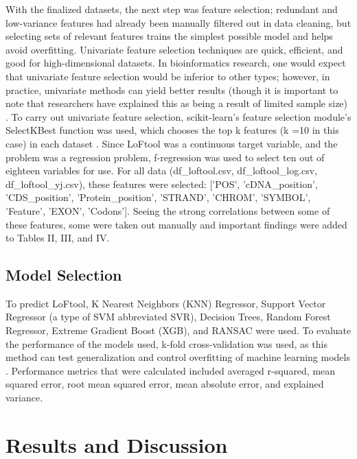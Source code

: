 \documentclass[journal,two side,web]{ieeecolor}
\begin{document}
With the finalized datasets, the next step was feature selection; redundant and low-variance features had already been manually filtered out in data cleaning, but selecting sets of relevant features trains the simplest possible model and helps avoid overfitting. Univariate feature selection techniques are quick, efficient, and good for high-dimensional datasets. In bioinformatics research, one would expect that univariate feature selection would be inferior to other types; however, in practice, univariate methods can yield better results (though it is important to note that researchers have explained this as being a result of limited sample size) \cite{ni2012review}. To carry out univariate feature selection, scikit-learn’s feature selection module’s SelectKBest function was used, which chooses the top k features (k =10 in this case) in each dataset \cite{scikit-learn-feature-selection}. Since LoFtool was a continuous target variable, and the problem was a regression problem, f-regression was used to select ten out of eighteen variables for use. For all data (df\_loftool.csv, df\_loftool\_log.csv, df\_loftool\_yj.csv), these features were selected: ['POS', 'cDNA\_position', 'CDS\_position', 'Protein\_position', 'STRAND', 'CHROM', 'SYMBOL', 'Feature', 'EXON', 'Codons']. Seeing the strong correlations between some of these features, some were taken out manually and important findings were added to Tables II, III, and IV.

\subsection{Model Selection}

To predict LoFtool, K Nearest Neighbors (KNN) Regressor, Support Vector Regressor (a type of SVM abbreviated SVR), Decision Trees, Random Forest Regressor, Extreme Gradient Boost (XGB), and RANSAC were used. To evaluate the performance of the models used, k-fold cross-validation was used, as this method can test generalization and control overfitting of machine learning models \cite{berrar2019cross}. Performance metrics that were calculated included averaged r-squared, mean squared error, root mean squared error, mean absolute error, and explained variance. 

\section{Results and Discussion}
\end{document}
